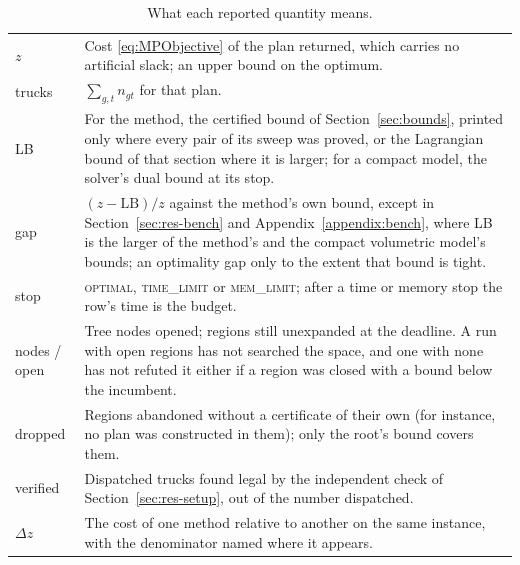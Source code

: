 \begin{table}[!htbp]
\centering
\small
\caption{What each reported quantity means.}
\label{tab:quantities}
\begin{tabular}{@{}lp{}@{}}
\toprule
$z$ & Cost \eqref{eq:MPObjective} of the plan returned, which carries
  no artificial slack; an upper bound on the optimum. \\
trucks & $\sum_{g,t}n_{gt}$ for that plan. \\
LB & For the method, the certified bound of Section~\ref{sec:bounds},
  printed only where every pair of its sweep was proved, or the
  Lagrangian bound of that section where it is larger; for a compact
  model, the solver's dual bound at its stop. \\
gap & $(z-\mathrm{LB})/z$ against the method's own bound, except in
  Section~\ref{sec:res-bench} and Appendix~\ref{appendix:bench}, where
  LB is the larger of the method's and the compact volumetric model's
  bounds; an optimality gap only to the extent that bound is tight. \\
stop & \textsc{optimal}, \textsc{time\_limit} or \textsc{mem\_limit};
  after a time or memory stop the row's time is the budget. \\
nodes / open & Tree nodes opened; regions still unexpanded at the
  deadline. A run with open regions has not searched the space, and one
  with none has not refuted it either if a region was closed with a
  bound below the incumbent. \\
dropped & Regions abandoned without a certificate of their own (for
  instance, no plan was constructed in them); only the root's bound
  covers them. \\
verified & Dispatched trucks found legal by the independent check of
  Section~\ref{sec:res-setup}, out of the number dispatched. \\
$\Delta z$ & The cost of one method relative to another on the same
  instance, with the denominator named where it appears. \\
\bottomrule
\end{tabular}
\end{table}
